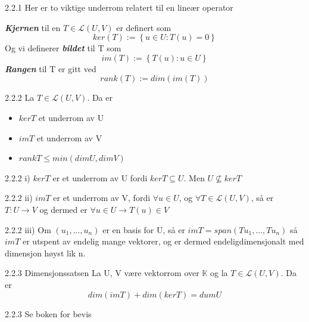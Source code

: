 \documentclass[a4paper,norsk]{article}
\renewcommand{\leq}{\leqslant}
\begin{document}
\begin{definitionbox}{2.2.1}{}
Her er to viktige underrom relatert til en lineær operator

\textbf{\textit{Kjernen}} til en $ T \in \mathcal{L} \left( U, V \right)  $ er definert som
\[
    ker \left( T \right) := \left\{ u \in U : T \left( u \right) =0 \right\} 
\]
Og vi definerer \textbf{\textit{bildet}} til T som 
\[
    im \left( T \right) := \left\{  T \left( u \right) : u \in U \right\} 
\]
\textbf{\textit{Rangen}} til T er gitt ved
\[
    rank \left( T \right) := dim \left( im \left( T \right)  \right) 
\]
\end{definitionbox}

\begin{propositionbox}{2.2.2}{}
La $ T \in \mathcal{L} \left( U, V \right)  $. Da er 
\begin{itemize}
  \item $ ker T $ et underrom av U
  \item $ im T $ et underrom av V
  \item $ rank T \leq min \left(  dim U, dim V \right)  $ 
\end{itemize}
\begin{proofbox}{2.2.2 i)}{}
$ ker T $ er et underrom av U fordi $ ker T \subseteq U $. Men $ U \not \subseteq ker T $ 
\end{proofbox}

\begin{proofbox}{2.2.2 ii)}{}
$ im T $ er et underrom av V, fordi $ \forall u \in  U $, og $ \forall T \in  \mathcal{L} \left( U, V \right)  $, så er $ T : U \rightarrow V $ og dermed er $ \forall u \in U  \rightarrow T \left( u \right) \in  V$ 
\end{proofbox}

\begin{proofbox}{2.2.2 iii)}{}
Om $ \left(  u_1, ..., u_n \right)  $ er en basis for U, så er $ im T = span \left( Tu_1, ..., Tu_n \right)  $ så $ im T $ er utspent av endelig mange vektorer, og er dermed endeligdimensjonalt med dimensjon høyst lik n.
\end{proofbox}
\end{propositionbox}

\begin{theorembox}{2.2.3 Dimensjonssatsen}{}
La U, V være vektorrom over $ \mathbb{K} $ og la $ T \in \mathcal{L} \left( U, V \right)  $. Da er
\[
    dim \left( im T \right) + dim \left( ker T \right) = dum U
\]
\begin{proofbox}{2.2.3}{}
Se boken for bevis
\end{proofbox}
\end{theorembox}
\end{document}
